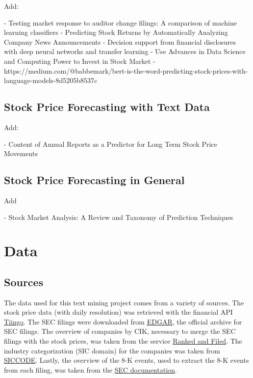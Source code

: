 \documentclass{article}
\begin{document}
	
	
	Add: 
	
	- Testing market response to auditor change filings: A comparison of machine learning classifiers
	- Predicting Stock Returns by Automatically Analyzing Company News Announcements
	- Decision support from financial disclosures with deep neural networks and transfer learning 
	- Use Advances in Data Science and Computing Power to Invest in Stock Market
	-  https://medium.com/@babbemark/bert-is-the-word-predicting-stock-prices-with-language-models-8d5205b8537c
	
	
	\subsection{Stock Price Forecasting with Text Data}
	
	Add: 
	
	- Content of Annual Reports as a Predictor for Long Term Stock Price Movements
	
	\subsection{Stock Price Forecasting in General}
	
	Add
	
	- Stock Market Analysis: A Review and Taxonomy of Prediction Techniques


	\section{Data}
	
	\subsection{Sources}
	
	
	The data used for this text mining project comes from a variety of sources. The stock price data (with daily resolution) was retrieved with the financial API \href{https://www.tiingo.com}{Tiingo}. The SEC filings were downloaded from \href{https://www.sec.gov/Archives/edgar/full-index/}{EDGAR}, the official archive for SEC filings. The overview of companies by CIK, necessary to merge the SEC filings with the stock prices, was taken from the service \href{http://rankandfiled.com/#/data/tickers}{Ranked and Filed}. The industry categorization (SIC domain) for the companies was taken from \href{https://siccode.com}{SICCODE}. Lastly, the overview of the 8-K events, used to extract the 8-K events from each filing, was taken from the  \href{https://www.sec.gov/fast-answers/answersform8khtm.html}{SEC documentation}. 
	
\end{document}

